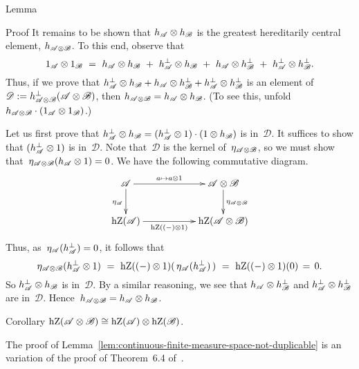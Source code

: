 \documentclass[main]{subfiles}
\begin{document}
\begin{parsec}
\begin{point}{Lemma}
\begin{point}{Proof}
It remains to be shown that
$h_{\mathscr{A}}\otimes h_\mathscr{B}$
is the greatest hereditarily central element,
$h_{\mathscr{A}\otimes \mathscr{B}}$.
To this end, observe that
\begin{equation*}
1_\scrA\otimes 1_\mathscr{B}
\ = \ 
h_\scrA\otimes h_\mathscr{B}
\ +\ 
h_\scrA^\perp\otimes h_\mathscr{B}
\ +\ 
h_\scrA\otimes h_\mathscr{B}^\perp
\ +\ 
h_\scrA^\perp\otimes h_\mathscr{B}^\perp.
\end{equation*}
Thus,
if we prove that
$h_{\mathscr{A}}^\perp\otimes h_\mathscr{B}
+ 
h_{\mathscr{A}}\otimes h_\mathscr{B}^\perp
+
h_{\mathscr{A}}^\perp\otimes h_\mathscr{B}^\perp$
is an element of~$\mathscr{D}:=
 h_{\mathscr{A}\otimes \mathscr{B}}^\perp
(\mathscr{A}\otimes\mathscr{B})$,
then $h_{\mathscr{A}\otimes \mathscr{B}}
= h_{\mathscr{A}}\otimes h_\mathscr{B}$.
(To see this, unfold $h_{\mathscr{A}\otimes \mathscr{B}}
\cdot (1_{\mathscr{A}}\otimes 1_\mathscr{B})$.)

Let us first prove that 
$h_{\mathscr{A}}^\perp \otimes h_\mathscr{B}
= (h_{\mathscr{A}}^\perp \otimes 1)\cdot(1\otimes h_\mathscr{B})$
is in~$\mathscr{D}$.
It suffices to show that 
$(h_{\mathscr{A}}^\perp \otimes 1)$
is in~$\mathscr{D}$.
Note that~$\mathscr{D}$ is the kernel 
of~$\eta_{\mathscr{A}\otimes\mathscr{B}}$,
so we must show that~$\eta_{\mathscr{A}\otimes\mathscr{B}}(h_{\mathscr{A}}
\otimes 1)=0$.
We have the following commutative diagram.
\begin{equation*}
\xymatrix{
\scrA
\ar[rr]^-{a\mapsto a\otimes 1}
\ar[d]_{\eta_\scrA}
&&
\scrA\otimes\mathscr{B}
\ar[d]^{\eta_{\scrA\otimes\mathscr{B}}}
\\
\hZ(\scrA)
\ar[rr]_-{\hZ((-)\otimes 1)}
&&
\hZ(\scrA\otimes \mathscr{B})
}
\end{equation*}
Thus,
as~$\eta_{\mathscr{A}}(h^\perp_{\mathscr{A}})=0$,
it follows that
\begin{equation*}
\eta_{\scrA\otimes \mathscr{B}}(h_\scrA^\perp
\otimes 1)
\ =\ 
\hZ((-)\otimes 1) (\, \eta_\scrA(h_\scrA^\perp)\,)
\ = \ 
\hZ((-)\otimes 1) (0)\,=\,0.
\end{equation*}
So
$h_{\mathscr{A}}^\perp \otimes h_\mathscr{B}$
is in~$\mathscr{D}$.
By a similar reasoning,
we see that 
$h_{\mathscr{A}} \otimes h^\perp_\mathscr{B}$
and
$h_{\mathscr{A}}^\perp \otimes h^\perp_\mathscr{B}$
are in~$\mathscr{D}$.
Hence~$h_{\mathscr{A}\otimes\mathscr{B}}
=h_{\mathscr{A}}\otimes h_\mathscr{B}$.
\end{point}
\end{point}
\begin{point}{Corollary}%
$\operatorname{hZ}(\mathscr{A}\otimes\mathscr{B})
\cong \operatorname{hZ}(\mathscr{A})\otimes\operatorname{hZ}(\mathscr{B})$.
\end{point}
\end{parsec}
The proof of 
Lemma~\ref{lem:continuous-finite-measure-space-not-duplicable} 
is an variation
of the proof of Theorem~6.4 of~\cite{Kornell2012}.
\end{document}
